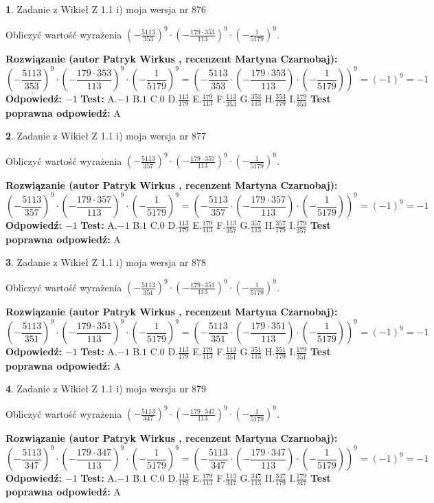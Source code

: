 \documentclass[12pt, a4paper]{article}
\theoremstyle{definition} %
\newtheorem{zad}{}
\newcommand{\zadStart}[1]{\begin{zad}#1\newline}
\newcommand{\zadStop}{\end{zad}}
\newcommand{\rozwStart}[2]{\noindent \textbf{Rozwiązanie (autor #1 , recenzent #2): }\newline}
\newcommand{\rozwStop}{\newline}
\newcommand{\odpStart}{\noindent \textbf{Odpowiedź:}\newline}
\newcommand{\odpStop}{\newline}
\newcommand{\testStart}{\noindent \textbf{Test:}\newline}
\newcommand{\testStop}{\newline}
\newcommand{\kluczStart}{\noindent \textbf{Test poprawna odpowiedź:}\newline}
\newcommand{\kluczStop}{\newline}
\begin{document}
\zadStart{Zadanie z Wikieł Z 1.1 i) moja wersja nr 876}

Obliczyć wartość wyrażenia $(-\frac{5113}{353})^{9} \cdot (-\frac{179 \cdot 353}{113})^{9} \cdot (-\frac{1}{5179})^{9}$.
\zadStop
\rozwStart{Patryk Wirkus}{Martyna Czarnobaj}
$$(-\frac{5113}{353})^{9} \cdot (-\frac{179 \cdot 353}{113})^{9} \cdot (-\frac{1}{5179})^{9} = (-\frac{5113}{353} \cdot (-\frac{179 \cdot 353}{113}) \cdot (-\frac{1}{5179}))^{9} = (-1)^{9} = -1$$
\rozwStop
\odpStart
$-1$
\odpStop
\testStart
A.$-1$ B.$1$ C.$0$ D.$\frac{113}{179}$ E.$\frac{179}{113}$
F.$\frac{113}{353}$ G.$\frac{353}{113}$
H.$\frac{353}{179}$
I.$\frac{179}{353}$
\testStop
\kluczStart
A
\kluczStop



\zadStart{Zadanie z Wikieł Z 1.1 i) moja wersja nr 877}

Obliczyć wartość wyrażenia $(-\frac{5113}{357})^{9} \cdot (-\frac{179 \cdot 357}{113})^{9} \cdot (-\frac{1}{5179})^{9}$.
\zadStop
\rozwStart{Patryk Wirkus}{Martyna Czarnobaj}
$$(-\frac{5113}{357})^{9} \cdot (-\frac{179 \cdot 357}{113})^{9} \cdot (-\frac{1}{5179})^{9} = (-\frac{5113}{357} \cdot (-\frac{179 \cdot 357}{113}) \cdot (-\frac{1}{5179}))^{9} = (-1)^{9} = -1$$
\rozwStop
\odpStart
$-1$
\odpStop
\testStart
A.$-1$ B.$1$ C.$0$ D.$\frac{113}{179}$ E.$\frac{179}{113}$
F.$\frac{113}{357}$ G.$\frac{357}{113}$
H.$\frac{357}{179}$
I.$\frac{179}{357}$
\testStop
\kluczStart
A
\kluczStop



\zadStart{Zadanie z Wikieł Z 1.1 i) moja wersja nr 878}

Obliczyć wartość wyrażenia $(-\frac{5113}{351})^{9} \cdot (-\frac{179 \cdot 351}{113})^{9} \cdot (-\frac{1}{5179})^{9}$.
\zadStop
\rozwStart{Patryk Wirkus}{Martyna Czarnobaj}
$$(-\frac{5113}{351})^{9} \cdot (-\frac{179 \cdot 351}{113})^{9} \cdot (-\frac{1}{5179})^{9} = (-\frac{5113}{351} \cdot (-\frac{179 \cdot 351}{113}) \cdot (-\frac{1}{5179}))^{9} = (-1)^{9} = -1$$
\rozwStop
\odpStart
$-1$
\odpStop
\testStart
A.$-1$ B.$1$ C.$0$ D.$\frac{113}{179}$ E.$\frac{179}{113}$
F.$\frac{113}{351}$ G.$\frac{351}{113}$
H.$\frac{351}{179}$
I.$\frac{179}{351}$
\testStop
\kluczStart
A
\kluczStop



\zadStart{Zadanie z Wikieł Z 1.1 i) moja wersja nr 879}

Obliczyć wartość wyrażenia $(-\frac{5113}{347})^{9} \cdot (-\frac{179 \cdot 347}{113})^{9} \cdot (-\frac{1}{5179})^{9}$.
\zadStop
\rozwStart{Patryk Wirkus}{Martyna Czarnobaj}
$$(-\frac{5113}{347})^{9} \cdot (-\frac{179 \cdot 347}{113})^{9} \cdot (-\frac{1}{5179})^{9} = (-\frac{5113}{347} \cdot (-\frac{179 \cdot 347}{113}) \cdot (-\frac{1}{5179}))^{9} = (-1)^{9} = -1$$
\rozwStop
\odpStart
$-1$
\odpStop
\testStart
A.$-1$ B.$1$ C.$0$ D.$\frac{113}{179}$ E.$\frac{179}{113}$
F.$\frac{113}{347}$ G.$\frac{347}{113}$
H.$\frac{347}{179}$
I.$\frac{179}{347}$
\testStop
\kluczStart
A
\kluczStop
\end{document}
